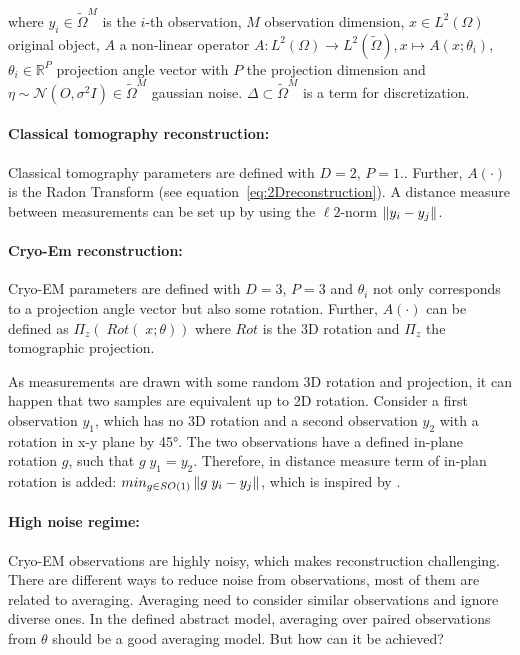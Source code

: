 where $y_i \in \tilde{\Omega}^M$ is the $i$-th observation, $M$ observation dimension,
$x \in L^2(\Omega)$ original object, $A$ a non-linear operator 
$A: L^2(\Omega) \to L^2(\tilde{\Omega}), x \mapsto A(x; \theta_i)$, 
$\theta_i \in \mathbb{R}^P$ projection angle vector with $P$ the projection dimension
and
$\eta \sim \mathcal{N}(O, \sigma^2 I) \in \tilde{\Omega}^M$ gaussian noise. 
$\Delta \subset \tilde{\Omega}^{M}$ is a term for discretization.

\paragraph{Classical tomography reconstruction:}

Classical tomography parameters are defined with $D=2$, $P=1$..
Further, $A(\cdot)$ is the Radon Transform (see equation~\ref{eq:2Dreconstruction}).
A distance measure between measurements can be set up by using the $\ell2$-norm $\left\lVert y_i - y_j\right\rVert$.

\paragraph{Cryo-Em reconstruction:}
Cryo-EM parameters are defined with $D=3$, $P=3$ and $\theta_i$ not only corresponds to
a projection angle vector but also some rotation.
Further, $A(\cdot)$ can be defined as $\Pi_z \left(\; Rot(\;x; \theta) \right)$ 
where $Rot$ is the 3D rotation and $\Pi_z$ the tomographic projection.

As measurements are drawn with some random 3D rotation and projection, 
it can happen that two samples are equivalent up to 2D rotation. 
Consider a first observation $y_1$, which has no 3D rotation and 
a second observation $y_2$ with a rotation in x-y plane by 45°.
The two observations have a defined in-plane rotation $g$, such that $g \; y_1 = y_2$.
Therefore, in distance measure term of in-plan rotation is added: $min_{g \in SO(1)}\left\lVert g \;y_i - y_j\right\rVert$, 
which is inspired by \cite{multiDiffusionMaps}. 


\paragraph{High noise regime:}
Cryo-EM observations are highly noisy, which makes reconstruction challenging. 
There are different ways to reduce noise from observations, most of them are related to averaging. 
Averaging need to consider similar observations and ignore diverse ones. 
In the defined abstract model, averaging over paired observations from $\theta$ should be a good averaging model.
But how can it be achieved? 

